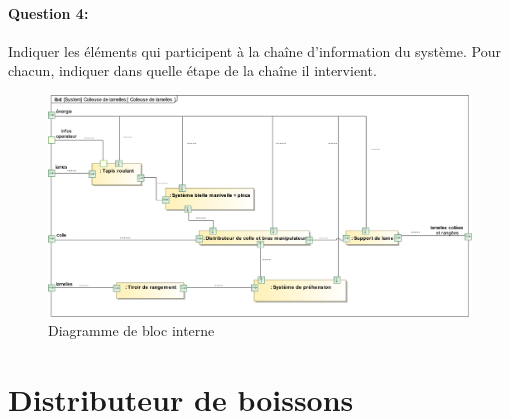 \paragraph{Question 4:}
Indiquer les éléments qui participent à la chaîne d'information du système. Pour chacun, indiquer dans quelle étape de la chaîne il intervient.

\begin{figure}[htbp]
\begin{center}
\includegraphics[width=0.95\linewidth]{img/colleuse_IBD}
\caption{Diagramme de bloc interne}
\label{fig:image105}
\end{center}
\end{figure}

\newpage

\section{Distributeur de boissons}

